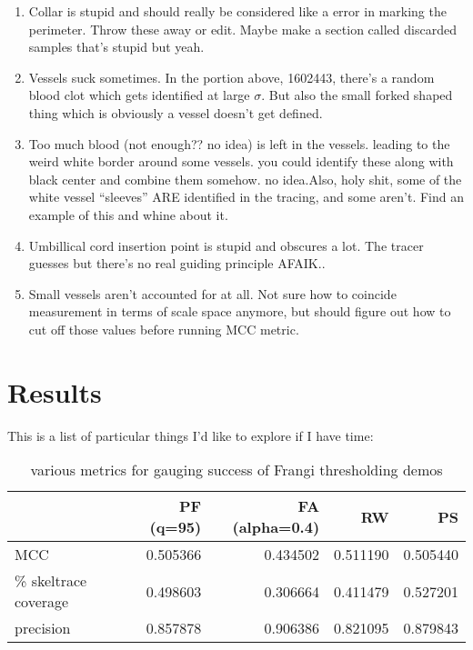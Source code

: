 \begin{enumerate}
\item Collar is stupid and should really be considered like a error in marking the perimeter. Throw these away or edit. Maybe make a section called discarded samples that's stupid but yeah.
\item Vessels suck sometimes. In the portion above, 1602443, there's a random blood clot which gets identified at large $\sigma$. But also the small forked shaped thing which is obviously a vessel doesn't get defined.
\item Too much blood (not enough?? no idea) is left in the vessels. leading to the weird white border around some vessels. you could identify these along with black center and combine them somehow. no idea.Also, holy shit, some of the white vessel ``sleeves'' ARE identified in the tracing, and some aren't. Find an example of this and whine about it.
\item Umbillical cord insertion point is stupid and obscures a lot. The tracer guesses but there's no real guiding principle AFAIK..
\item Small vessels aren't accounted for at all. Not sure how to coincide measurement in terms of scale space anymore, but should figure out how to cut off those values before running MCC metric.
\end{enumerate}





\section{Results}

This is a list of particular things I'd like to explore if I have time:
\begin{table}
\begin{tabular}{lrrrr}
  {} &  PF (q=95) &  FA (alpha=0.4) &  RW &  PS \\
  \hline
  MCC                  &                     0.505366 &                     0.434502 &      0.511190 &          0.505440 \\
  \% skeltrace coverage &                     0.498603 &                     0.306664 &      0.411479 &          0.527201 \\
  precision            &                     0.857878 &                     0.906386 &      0.821095 &          0.879843 \\
\end{tabular}
\caption{various metrics for gauging success of Frangi thresholding demos}
\end{table}


